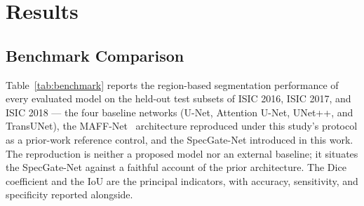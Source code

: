 \section{Results}
\label{sec:results}

\subsection{Benchmark Comparison}
\label{subsec:benchmark}

Table~\ref{tab:benchmark} reports the region-based segmentation performance of every evaluated model on the held-out test subsets of ISIC 2016, ISIC 2017, and ISIC 2018 --- the four baseline networks (U-Net, Attention U-Net, UNet++, and TransUNet), the MAFF-Net~\cite{ref15} architecture reproduced under this study's protocol as a prior-work reference control, and the SpecGate-Net introduced in this work. The reproduction is neither a proposed model nor an external baseline; it situates the SpecGate-Net against a faithful account of the prior architecture. The Dice coefficient and the IoU are the principal indicators, with accuracy, sensitivity, and specificity reported alongside.

